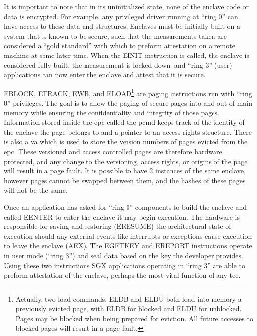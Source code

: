 It is important to note that in its uninitialized state, none of the enclave code or data is encrypted. For example, any privileged driver running at ``ring 0'' can have access to these data and structures. Enclaves must be initially built on a system that is known to be secure, such that the measurements taken are considered a ``gold standard'' with which to preform attestation on a remote machine at some later time. When the EINIT instruction is called, the enclave is considered fully built, the measurement is locked down, and ``ring 3'' (user) applications can now enter the enclave and attest that it is secure. 

EBLOCK, ETRACK, EWB, and ELOAD\footnote{Actually, two load commands, ELDB and ELDU both load into memory a previously evicted page, with ELDB for blocked and ELDU for unblocked. Pages may be blocked when being prepared for eviction. All future accesses to blocked pages will result in a page fault.} are paging instructions run with ``ring 0'' privileges. The goal is to allow the paging of secure pages into and out of main memory while ensuring the confidentiality and integrity of those pages. Information stored inside the \gls{epc} called the \gls{pcmd} keeps track of the identity of the enclave the page belongs to and a pointer to an access rights structure. There is also a \gls{va} which is used to store the version numbers of pages evicted from the \gls{epc}. These versioned and access controlled pages are therefore hardware protected, and any change to the versioning, access rights, or origins of the page will result in a page fault. It is possible to have 2 instances of the same enclave, however pages cannot be swapped between them, and the hashes of these pages will not be the same.

Once an application has asked for ``ring 0'' components to build the enclave and called EENTER to enter the enclave it may begin execution. The hardware is responsible for saving and restoring (ERESUME) the architectural state of execution should any external events like interrupts or exceptions cause execution to leave the enclave (AEX). The EGETKEY and EREPORT instructions operate in user mode (``ring 3'') and seal data based on the key the developer provides. Using these two instructions SGX applications operating in ``ring 3'' are able to preform attestation of the enclave, perhaps the most vital function of any \gls{tee}.

